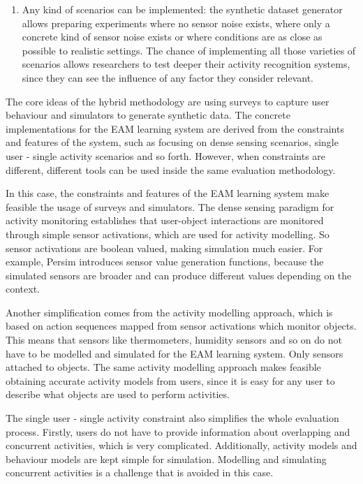 \begin{enumerate}
 \item Any kind of scenarios can be implemented: the synthetic dataset generator allows preparing experiments where no sensor noise exists, where only a concrete kind of sensor noise exists or where conditions are as close as possible to realistic settings. The chance of implementing all those varieties of scenarios allows researchers to test deeper their activity recognition systems, since they can see the influence of any factor they consider relevant. 
\end{enumerate}

The core ideas of the hybrid methodology are using surveys to capture user behaviour and simulators to generate synthetic data. The concrete implementations for the EAM learning system are derived from the constraints and features of the system, such as focusing on dense sensing scenarios, single user - single activity scenarios and so forth. However, when constraints are different, different tools can be used inside the same evaluation methodology. 

In this case, the constraints and features of the EAM learning system make feasible the usage of surveys and simulators. The dense sensing paradigm for activity monitoring establishes that user-object interactions are monitored through simple sensor activations, which are used for activity modelling. So sensor activations are boolean valued, making simulation much easier. For example, Persim introduces sensor value generation functions, because the simulated sensors are broader and can produce different values depending on the context. 

Another simplification comes from the activity modelling approach, which is based on action sequences mapped from sensor activations which monitor objects. This means that sensors like thermometers, humidity sensors and so on do not have to be modelled and simulated for the EAM learning system. Only sensors attached to objects. The same activity modelling approach makes feasible obtaining accurate activity models from users, since it is easy for any user to describe what objects are used to perform activities. 

The single user - single activity constraint also simplifies the whole evaluation process. Firstly, users do not have to provide information about overlapping and concurrent activities, which is very complicated. Additionally, activity models and behaviour models are kept simple for simulation. Modelling and simulating concurrent activities is a challenge that is avoided in this case. 

